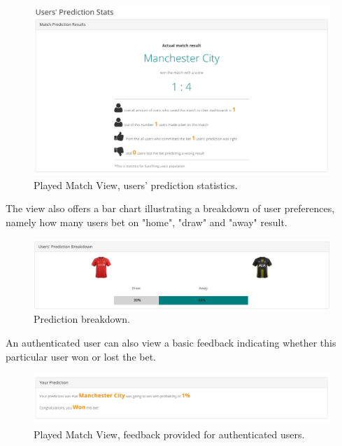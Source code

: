 \begin{figure}[H]
	\begin{center}
		\includegraphics[width=.90\textwidth]{impl/images/predictionStats}
		\caption{Played Match View, users' prediction statistics.} \label{fig:predictionStats}
	\end{center}
\end{figure}

The view also offers a bar chart illustrating a breakdown of user preferences, namely how many users bet on "home", "draw" and "away" result.

\begin{figure}[H]
	\begin{center}
		\includegraphics[width=.90\textwidth]{impl/images/predictionBreakdown}
		\caption{Prediction breakdown.} \label{fig:predictionBreakdown}
	\end{center}
\end{figure}

An authenticated user can also view a basic feedback indicating whether this particular user won or lost the bet.

\begin{figure}[H]
	\begin{center}
		\includegraphics[width=.90\textwidth]{impl/images/feedback}
		\caption{Played Match View, feedback provided for authenticated users.} \label{fig:feedback}
	\end{center}
\end{figure}

